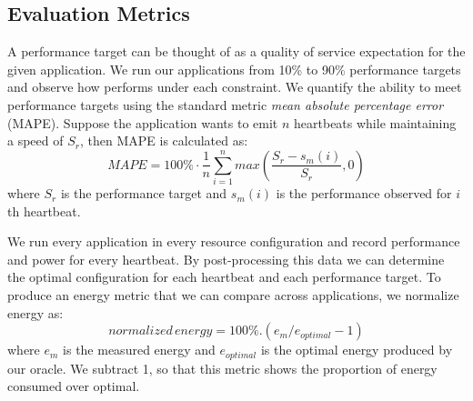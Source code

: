 \subsection{Evaluation Metrics}

A performance target can be thought of as a quality of service
expectation for the given application. We run our applications from
10\% to 90\% performance targets and observe how \SYSTEM{} performs
under each constraint. We quantify the ability to meet performance
targets using the standard metric \emph{mean absolute percentage
  error} (MAPE).  Suppose the application wants to emit $n$ heartbeats
while maintaining a speed of $S_r$, then MAPE is calculated as:
\begin{equation}
MAPE = 100\% \cdot \frac{1}{n} \sum\limits_{i=1}^{n} max \left( \frac{S_{r} - s_m(i)}{S_r},0 \right)
\end{equation}
where $S_{r}$ is the performance target and $s_m(i)$ is the
performance observed for $i$th heartbeat.


We run every
application in every resource configuration and record performance and
power for every heartbeat.  By post-processing this data we can
determine the optimal configuration for each heartbeat and each
performance target. To produce an energy metric that we can compare
across applications, we normalize energy as:
\begin{equation}
  normalized\,energy = 100\% . (e_m / e_{optimal} - 1)
\end{equation}
where $e_m$ is the measured energy and $e_{optimal}$ is the optimal
energy produced by our oracle. We subtract 1, so that this metric
shows the proportion of energy consumed over optimal. 

